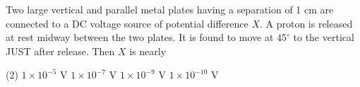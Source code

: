 
\item Two large vertical and parallel metal plates having a separation of 1 cm are connected to a DC voltage source of potential difference \(X\). A proton is released at rest midway between the two plates. It is found to move at \(45^\circ\) to the vertical JUST after release. Then \(X\) is nearly
    \begin{tasks}(2)
        \task \(1 \times 10^{-5}\) V
        \task \(1 \times 10^{-7}\) V
        \task \(1 \times 10^{-9}\) V
        \task \(1 \times 10^{-10}\) V
    \end{tasks}
